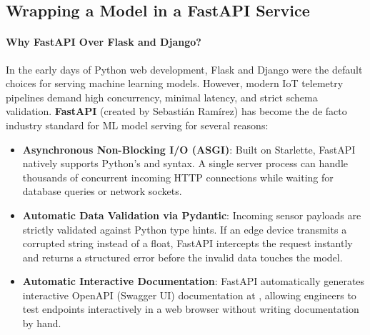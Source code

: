\subsection{Wrapping a Model in a FastAPI Service}\label{subsec:fastapi_service}

\paragraph{Why FastAPI Over Flask and Django?}
In the early days of Python web development, Flask and Django were the default choices for serving machine learning models. However, modern IoT telemetry pipelines demand high concurrency, minimal latency, and strict schema validation. \textbf{FastAPI} (created by Sebastián Ramírez) has become the de facto industry standard for ML model serving for several reasons:
\begin{itemize}
    \item \textbf{Asynchronous Non-Blocking I/O (ASGI)}: Built on Starlette, FastAPI natively supports Python's  and  syntax. A single server process can handle thousands of concurrent incoming HTTP connections while waiting for database queries or network sockets.
    \item \textbf{Automatic Data Validation via Pydantic}: Incoming sensor payloads are strictly validated against Python type hints. If an edge device transmits a corrupted string instead of a float, FastAPI intercepts the request instantly and returns a structured  error before the invalid data touches the model.
    \item \textbf{Automatic Interactive Documentation}: FastAPI automatically generates interactive OpenAPI (Swagger UI) documentation at , allowing engineers to test endpoints interactively in a web browser without writing documentation by hand.
\end{itemize}

